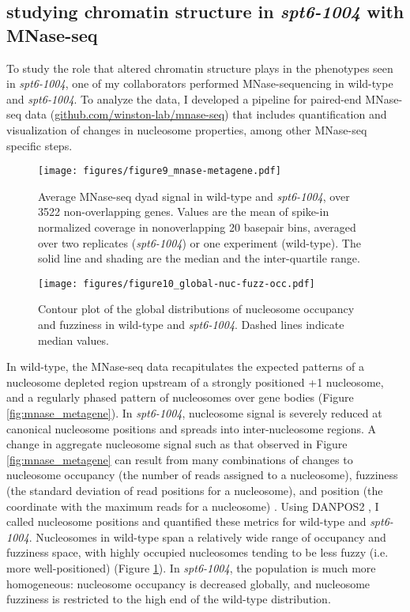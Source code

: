 \documentclass[9pt, letterpaper]{article}
\begin{document}
\subsection{studying chromatin structure in \textit{spt6-1004} with MNase-seq}

To study the role that altered chromatin structure plays in the phenotypes seen in \textit{spt6-1004}, one of my collaborators performed MNase-sequencing in wild-type and \textit{spt6-1004}. To analyze the data, I developed a pipeline for paired-end MNase-seq data (\href{https://github.com/winston-lab/mnase-seq}{github.com/winston-lab/mnase-seq}) that includes quantification and visualization of changes in nucleosome properties, among other MNase-seq specific steps.

\begin{figure}[H]
    \centering
    \begin{minipage}[t]{8.5cm}
        \centering
        \texttt{[image: figures/figure9\_mnase-metagene.pdf]}
        \caption{Average MNase-seq dyad signal in wild-type and \textit{spt6-1004}, over 3522 non-overlapping genes. Values are the mean of spike-in normalized coverage in nonoverlapping 20 basepair bins, averaged over two replicates (\textit{spt6-1004}) or one experiment (wild-type). The solid line and shading are the median and the inter-quartile range.}
        \label{fig:mnase_metagene}
    \end{minipage}\hfill
    \begin{minipage}[t]{8.5cm}
        \centering
        \texttt{[image: figures/figure10\_global-nuc-fuzz-occ.pdf]}
        \caption{Contour plot of the global distributions of nucleosome occupancy and fuzziness in wild-type and \textit{spt6-1004}. Dashed lines indicate median values.}
        \label{fig:global_nuc_fuzz}
    \end{minipage}
\end{figure}

In wild-type, the MNase-seq data recapitulates the expected patterns of a nucleosome depleted region upstream of a strongly positioned +1 nucleosome, and a regularly phased pattern of nucleosomes over gene bodies (Figure \ref{fig:mnase_metagene}). In \textit{spt6-1004}, nucleosome signal is severely reduced at canonical nucleosome positions and spreads into inter-nucleosome regions. A change in aggregate nucleosome signal such as that observed in Figure \ref{fig:mnase_metagene} can result from many combinations of changes to nucleosome occupancy (the number of reads assigned to a nucleosome), fuzziness (the standard deviation of read positions for a nucleosome), and position (the coordinate with the maximum reads for a nucleosome) \cite{chen2013}. Using DANPOS2 \cite{chen2013}, I called nucleosome positions and quantified these metrics for wild-type and \textit{spt6-1004}. Nucleosomes in wild-type span a relatively wide range of occupancy and fuzziness space, with highly occupied nucleosomes tending to be less fuzzy (i.e. more well-positioned) (Figure \ref{fig:global_nuc_fuzz}). In \textit{spt6-1004}, the population is much more homogeneous: nucleosome occupancy is decreased globally, and nucleosome fuzziness is restricted to the high end of the wild-type distribution.
\end{document}
